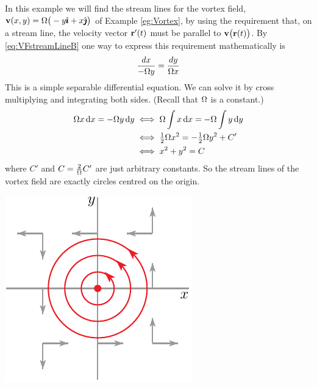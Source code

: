 \begin{eg}
             \label{eg:vortexStreamParallel}
 In this example we will find the stream lines for the vortex field, 
$\mathbf{v}(x,y) = \Omega\big(-y\hat{\pmb{\imath}} +x\hat{\pmb{\jmath}}\big)$ of Example \ref{eg:Vortex},
by using the requirement that, on a stream line, the velocity vector
$\mathbf{r}'(t)$ must be parallel to $\mathbf{v}\big(\mathbf{r}(t)\big)$. 
By \eqref{eq:VFstreamLineB} one way to express this requirement mathematically is
\begin{align*}
\frac{dx}{-\Omega y} = \frac{dy}{\Omega x}
\end{align*}
This is a simple separable differential equation. We can solve it 
by cross multiplying and integrating both sides. (Recall that $\Omega$ is a 
constant.)
\begin{align*}
\Omega x\,\mathrm{d}x = -\Omega y\,\mathrm{d}y
&\iff \Omega \int x\,\mathrm{d}x = -\Omega \int y\,\mathrm{d}y \\
&\iff \tfrac{1}{2} \Omega x^2 =-\tfrac{1}{2} \Omega y^2 +C' \\
&\iff x^2+y^2 = C
\end{align*}
where $C'$ and $C=\frac{2}{\Omega}C'$ are just arbitrary constants. So the stream lines of the vortex field are exactly circles centred on the origin.
\begin{efig}
\begin{center}
    \includegraphics{phaseVortex3.pdf}
\end{center}
\end{efig}



\end{eg}
